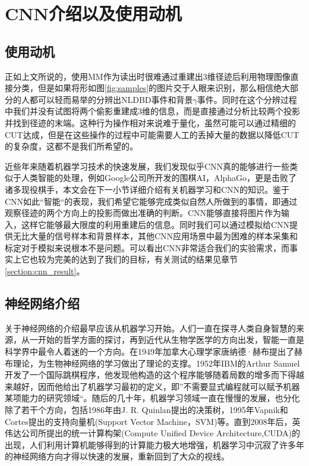 \section{CNN介绍以及使用动机}

\subsection{使用动机}
正如上文所说的，使用MM作为读出时很难通过重建出3维径迹后利用物理图像直接分类，但是如果将形如图\ref{fig:samples}的图片交于人眼来识别，那么相信绝大部分的人都可以轻而易举的分辨出NLDBD事件和背景$\gamma$事件。同时在这个分辨过程中我们并没有试图将两个偷影重建成3维的信息，而是直接通过分析比较两个投影并找到径迹的末端。这种行为操作相对来说难于量化，虽然可能可以通过精细的CUT达成，但是在这些操作的过程中可能需要人工的丢掉大量的数据以降低CUT的复杂度，这都不是我们所希望的。

近些年来随着机器学习技术的快速发展，我们发现似乎CNN真的能够进行一些类似于人类智能的处理，例如Google公司所开发的围棋AI，AlphaGo\supercite{gibney2016google}，更是击败了诸多现役棋手，本文会在下一小节详细介绍有关机器学习和CNN的知识。鉴于CNN如此“智能“的表现，我们希望它能够完成类似自然人所做到的事情，即通过观察径迹的两个方向上的投影而做出准确的判断。CNN能够直接将图片作为输入，这样它能够最大限度的利用重建后的信息。同时我们可以通过模拟给CNN提供无比大量的信号样本和背景样本，其他CNN应用场景中最为困难的样本采集和标定对于模拟来说根本不是问题。可以看出CNN非常适合我们的实验需求，而事实上它也较为完美的达到了我们的目标，有关测试的结果见章节\ref{section:cnn_result}。

\subsection{神经网络介绍}

关于神经网络的介绍最早应该从机器学习开始。人们一直在探寻人类自身智慧的来源，从一开始的哲学方面的探讨，再到近代从生物学医学的方向出发，智能一直是科学界中最令人着迷的一个方向。在1949年加拿大心理学家唐纳德·赫布提出了赫布理论\supercite{hebbian}，为生物神经网络的学习做出了理论的支撑。1952年IBM的Arthur Samuel开发了一个国际跳棋程序，他发现他构造的这个程序能够随着局数的增多而下得越来越好，因而他给出了机器学习最初的定义，即”不需要显式编程就可以赋予机器某项能力的研究领域“。随后的几十年，机器学习领域一直在慢慢的发展，也分化除了若干个方向，包括1986年由J. R. Quinlan提出的决策树，1995年Vapnik和Cortes提出的支持向量机(Support Vector Machine，SVM)等\supercite{mlhistory}。直到2008年后，英伟达公司所提出的统一计算构架(Compute Unified Device Architecture,CUDA)\supercite{CUDA}的出现，人们利用计算机能够得到的计算能力极大地增强，机器学习中沉寂了许多年的神经网络方向才得以快速的发展，重新回到了大众的视线。

